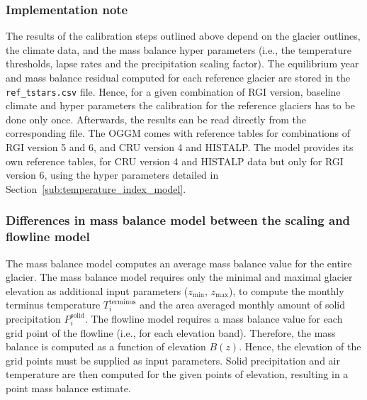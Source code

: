 

        \subsubsection{Implementation note} %
        \label{ssub:mb_calib_implementation_note}

            The results of the calibration steps outlined above depend on the glacier outlines, the climate data, and the mass balance hyper parameters (i.e., the temperature thresholds, lapse rates and the precipitation scaling factor). The equilibrium year \tstar{} and mass balance residual \bias{} computed for each reference glacier are stored in the \lstinline`ref_tstars.csv` file. Hence, for a given combination of RGI version, baseline climate and hyper parameters the calibration for the reference glaciers has to be done only once. Afterwards, the results can be read directly from the corresponding file. The OGGM comes with reference tables for combinations of RGI version 5 and 6, and CRU version 4 and HISTALP. The \vas{} model provides its own reference tables, for CRU version 4 and HISTALP data but only for RGI version 6, using the hyper parameters detailed in Section~\ref{sub:temperature_index_model}.
        

        \subsubsection{Differences in mass balance model between the scaling and flowline model}

            The \vas{} mass balance model computes an average mass balance value for the entire glacier. The mass balance model requires only the minimal and maximal glacier elevation as additional input parameters ($z_\text{min}$, $z_\text{max}$), to compute the monthly terminus temperature $T_i^\text{terminus}$ and the area averaged monthly amount of solid precipitation $P_i^\text{solid}$. The flowline model requires a mass balance value for each grid point of the flowline (i.e., for each elevation band). Therefore, the mass balance is computed as a function of elevation $B(z)$. Hence, the elevation of the grid points must be supplied as input parameters. Solid precipitation and air temperature are then computed for the given points of elevation, resulting in a point mass balance estimate.
    
